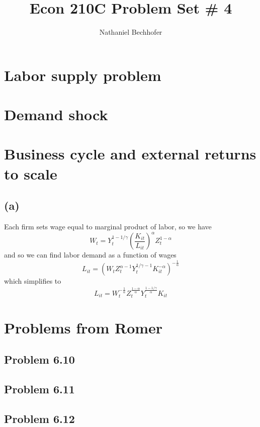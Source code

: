 \documentclass[11pt]{amsart}
\title{Econ 210C Problem Set \# 4}
\author{Nathaniel Bechhofer}
\begin{document}
\maketitle

\section{Labor supply problem}
\section{Demand shock}

\section{Business cycle and external returns to scale}

\subsection*{(a)}

Each firm sets wage equal to marginal product of labor, so we have
\[
W_t = Y_t^{1-1/\gamma} \left(\frac{K_{it}}{L_{it}}\right)^{\alpha} Z_t^{1-\alpha}
\]
and so we can find labor demand as a function of wages
\[
L_{it} = (W_t Z_t^{\alpha-1} Y_t^{1/\gamma -1} K_{it}^{-\alpha})^{-\frac{1}{\alpha}}
\]
which simplifies to
\[
L_{it} = W_t^{-\frac{1}{\alpha}} Z_t^{\frac{1-\alpha}{\alpha}} Y_t^{\frac{1-1/\gamma}{\alpha}} K_{it}
\]

\section{Problems from Romer}
\subsection{Problem 6.10}

\subsection{Problem 6.11}

\subsection{Problem 6.12}
\end{document}
